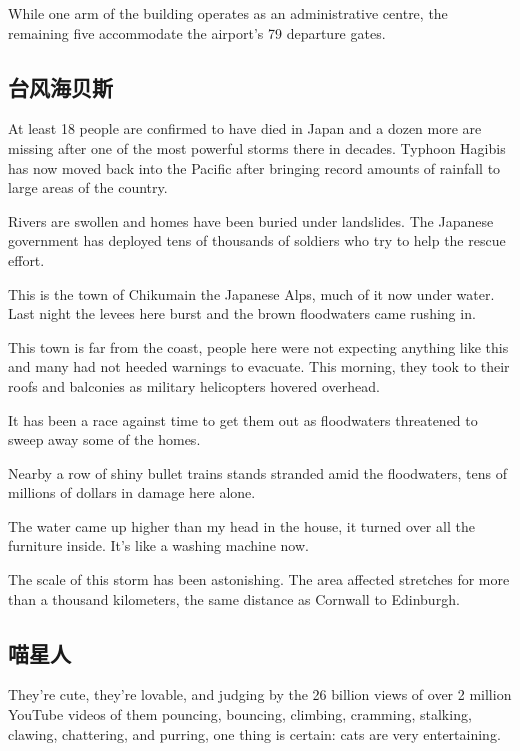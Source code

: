 While one arm of the building operates as an administrative centre, the remaining five accommodate the airport's 79 departure gates.
\subsection{台风海贝斯}
\begin{margintable}\vspace{-2cm}\footnotesize
\end{margintable}

At least 18 people are confirmed to have died in Japan and a dozen more are missing after one of the most powerful storms there in decades. Typhoon Hagibis has now moved back into the Pacific after bringing record amounts of rainfall to large areas of the country.

Rivers are swollen and homes have been buried under landslides. The Japanese government has deployed tens of thousands of soldiers who try to help the rescue effort.

This is the town of Chikumain the Japanese Alps, much of it now under water. Last night the levees here burst and the brown floodwaters came rushing in.

This town is far from the coast, people here were not expecting anything like this and many had not heeded warnings to evacuate. This morning, they took to their roofs and balconies as military helicopters hovered overhead.

It has been a race against time to get them out as floodwaters threatened to sweep away some of the homes.

Nearby a row of shiny bullet trains stands stranded amid the floodwaters, tens of millions of dollars in damage here alone. 

The water came up higher than my head in the house, it turned over all the furniture inside. It's like a washing machine now.

The scale of this storm has been astonishing. The area affected stretches for more than a thousand kilometers, the same distance as Cornwall to Edinburgh.
\subsection{喵星人}
\begin{margintable}\vspace{-2cm}\footnotesize
\end{margintable}
They're cute, they're lovable, and judging by the 26 billion views of over 2 million YouTube videos of them pouncing, bouncing, climbing, cramming, stalking, clawing, chattering, and purring, one thing is certain: cats are very entertaining.

